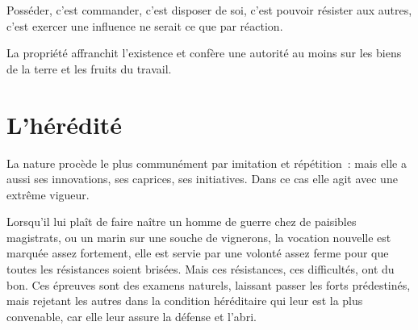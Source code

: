 \documentclass[french,twoside]{book} %
\newcommand{\astermono}{\medskip\centerline{\color{rubric}\large\selectfont{\syms ✻}}\medskip\par}%
\begin{document}
\astermono

\noindent Posséder, c’est commander, c’est disposer de soi, c’est pouvoir résister aux autres, c’est exercer une influence ne serait ce que par réaction.\par
La propriété affranchit l’existence et confère une autorité au moins sur les biens de la terre et les fruits du travail.
\section[L’hérédité]{L’hérédité}
\noindent La nature procède le plus communément par imitation et répétition : mais elle a aussi ses innovations, ses caprices, ses initiatives. Dans ce cas elle agit avec une extrême vigueur.\par
Lorsqu’il lui plaît de faire naître un homme de guerre chez de paisibles magistrats, ou un marin sur une souche de vignerons, la vocation nouvelle est marquée assez fortement, elle est servie par une volonté assez ferme pour que toutes les résistances soient brisées. Mais ces résistances, ces difficultés, ont du bon. Ces épreuves sont des examens naturels, laissant passer les forts prédestinés, mais rejetant les autres dans la condition héréditaire qui leur est la plus convenable, car elle leur assure la défense et l’abri.\par

\astermono
\end{document}
